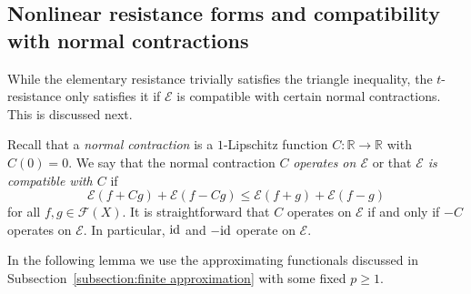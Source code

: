 \documentclass[a4paper,11pt,reqno]{amsart}
\theoremstyle{definition}
\numberwithin{equation}{section}
\newcommand{\cE}{{\mathcal E}}
\newcommand{\cF}{{\mathcal F}}
\newcommand{\R}{{\mathbb R}}
\newcommand{\1}{\mathds{1}}
\begin{document}
 
 \subsection{Nonlinear resistance forms and compatibility with normal contractions}
 
 
 
 While the elementary resistance trivially satisfies the triangle inequality,   the $t$-resistance only satisfies it if $\cE$ is compatible with certain normal contractions. This is discussed next. 
 
 Recall that a {\em normal contraction}  is a $1$-Lipschitz function $C \colon \R \to \R$ with $C(0) = 0$. We say that the normal contraction $C$ {\em operates on $\cE$} or that {\em $\cE$ is compatible with $C$} if 
 $$\cE(f + C g) + \cE(f - Cg) \leq \cE(f + g) + \cE(f - g)$$
 for all $f,g \in  \cF(X)$. 
 It is straightforward that $C$ operates on $\cE$ if and only if $-C$ operates on $\cE$. In particular, ${\rm id}$ and $-{\rm id}$ operate on $\cE$.
 
 
 In the following lemma we use the approximating functionals discussed in Subsection~\ref{subsection:finite approximation} with some fixed $p \geq 1$.
 
 
 
\end{document}
